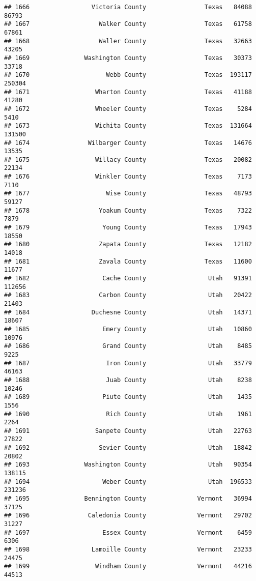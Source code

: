 \documentclass[
]{article}
\begin{document}
\begin{verbatim}
## 1666                 Victoria County                Texas   84088   86793
## 1667                   Walker County                Texas   61758   67861
## 1668                   Waller County                Texas   32663   43205
## 1669               Washington County                Texas   30373   33718
## 1670                     Webb County                Texas  193117  250304
## 1671                  Wharton County                Texas   41188   41280
## 1672                  Wheeler County                Texas    5284    5410
## 1673                  Wichita County                Texas  131664  131500
## 1674                Wilbarger County                Texas   14676   13535
## 1675                  Willacy County                Texas   20082   22134
## 1676                  Winkler County                Texas    7173    7110
## 1677                     Wise County                Texas   48793   59127
## 1678                   Yoakum County                Texas    7322    7879
## 1679                    Young County                Texas   17943   18550
## 1680                   Zapata County                Texas   12182   14018
## 1681                   Zavala County                Texas   11600   11677
## 1682                    Cache County                 Utah   91391  112656
## 1683                   Carbon County                 Utah   20422   21403
## 1684                 Duchesne County                 Utah   14371   18607
## 1685                    Emery County                 Utah   10860   10976
## 1686                    Grand County                 Utah    8485    9225
## 1687                     Iron County                 Utah   33779   46163
## 1688                     Juab County                 Utah    8238   10246
## 1689                    Piute County                 Utah    1435    1556
## 1690                     Rich County                 Utah    1961    2264
## 1691                  Sanpete County                 Utah   22763   27822
## 1692                   Sevier County                 Utah   18842   20802
## 1693               Washington County                 Utah   90354  138115
## 1694                    Weber County                 Utah  196533  231236
## 1695               Bennington County              Vermont   36994   37125
## 1696                Caledonia County              Vermont   29702   31227
## 1697                    Essex County              Vermont    6459    6306
## 1698                 Lamoille County              Vermont   23233   24475
## 1699                  Windham County              Vermont   44216   44513

\end{verbatim}
\end{document}

